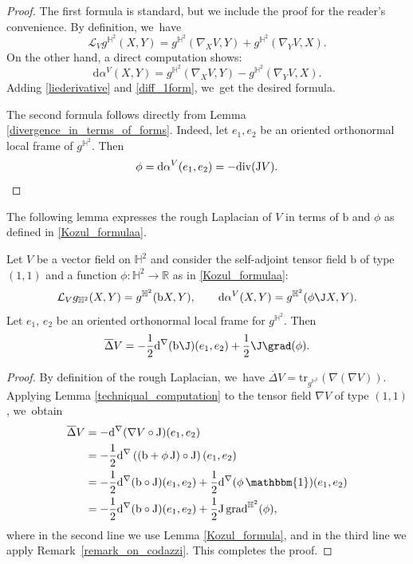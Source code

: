 \begin{proof}
The first formula is standard, but we include the proof for the reader's convenience. By definition, we~have
\begin{equation}\label{liederivative}
\mathcal{L}_Vg^{\mathbb{H}^2}(X,Y)=g^{\mathbb{H}^2}(\nabla_XV,Y)+g^{\mathbb{H}^2}(\nabla_YV,X).
\end{equation}
On the other hand, a direct computation shows:
\begin{equation}\label{diff_1form}
\mathrm{d}\alpha^V(X,Y)=g^{\mathbb{H}^2}(\nabla_XV,Y)-g^{\mathbb{H}^2}(\nabla_YV,X).
\end{equation}
Adding \eqref{liederivative} and \eqref{diff_1form}, we~get the desired formula.

The second formula follows directly from Lemma \ref{divergence_in_terms_of_forms}. Indeed, let $e_1, e_2$ be an oriented orthonormal local frame of $g^{\mathbb{H}^2}$. Then
\[
\phi=\mathrm{d}\alpha^V(e_1,e_2)=-\mathrm{div}(\mathrm{J} V). \qedhere
\]
\end{proof}
The following lemma expresses the rough Laplacian of \(V \) in terms of \(\mathrm{b} \) and \(\phi \) as defined in \eqref{Kozul_formulaa}.
\begin{lemma}\label{prepa1_CH_HL}
Let $V$ be a vector field on $\mathbb{H}^2$ and consider the self-adjoint tensor field $\mathrm{b}$ of type $(1,1)$ and a function $\phi:\mathbb{H}^2\to \mathbb{R}$ as in \eqref{Kozul_formulaa}:
\[
\mathcal{L}_Vg_{\mathbb{H}^2}(X,Y)=g^{\mathbb{H}^2}(\mathrm{b} X,Y),\qquad \mathrm{d}\alpha^V(X,Y)=g^{\mathbb{H}^2}(\phi \J X,Y).
\]Let $e_1$, $e_2$ be an oriented orthonormal local frame for $g^{\mathbb{H}^2}$. Then
\[
\overline{\Delta}V=-\frac{1}{2}\mathrm{d}^{\nabla}(\mathrm{b}\J)(e_1,e_2)+\frac{1}{2}\J\grad(\phi).
\]
\end{lemma}

\begin{proof}
By definition of the rough Laplacian, we~have \(\overline{\Delta}V = \mathrm{tr}_{g^{\mathbb{H}^2}}(\nabla (\nabla V))\). Applying Lemma \ref{techniqual_computation} to the tensor field \(\nabla V\) of type $(1,1)$, we~obtain
\begin{align*}
\overline{\Delta} V &= -\mathrm{d}^{\nabla}(\nabla V \circ \mathrm{J})(e_1,e_2) \\
&= -\frac{1}{2} \mathrm{d}^{\nabla}\left((\mathrm{b} + \phi\, \mathrm{J}) \circ \mathrm{J}\right) (e_1,e_2)\\
&= -\frac{1}{2} \mathrm{d}^{\nabla}(\mathrm{b} \circ \mathrm{J})(e_1,e_2) + \frac{1}{2} \mathrm{d}^{\nabla}(\phi\, \mathbbm{1})(e_1,e_2) \\
&= -\frac{1}{2} \mathrm{d}^{\nabla}(\mathrm{b} \circ \mathrm{J})(e_1,e_2) + \frac{1}{2} \mathrm{J} \, \mathrm{grad}^{\mathbb{H}^2}(\phi),
\end{align*}
where in the second line we use Lemma \ref{Kozul_formula}, and in the third line we apply Remark~\ref{remark_on_codazzi}. This completes the proof.
\end{proof}

